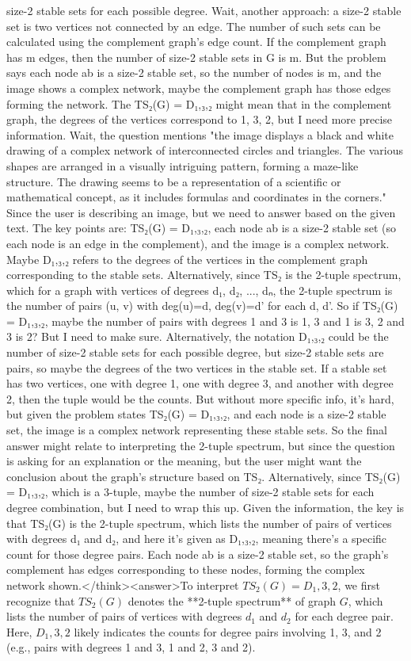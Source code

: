 size-2 stable sets for each possible degree. Wait, another approach: a size-2 stable set is two vertices not connected by an edge. The number of such sets can be calculated using the complement graph's edge count. If the complement graph has m edges, then the number of size-2 stable sets in G is m. But the problem says each node ab is a size-2 stable set, so the number of nodes is m, and the image shows a complex network, maybe the complement graph has those edges forming the network. The TS₂(G) = D₁,₃,₂ might mean that in the complement graph, the degrees of the vertices correspond to 1, 3, 2, but I need more precise information. Wait, the question mentions "the image displays a black and white drawing of a complex network of interconnected circles and triangles. The various shapes are arranged in a visually intriguing pattern, forming a maze-like structure. The drawing seems to be a representation of a scientific or mathematical concept, as it includes formulas and coordinates in the corners." Since the user is describing an image, but we need to answer based on the given text. The key points are: TS₂(G) = D₁,₃,₂, each node ab is a size-2 stable set (so each node is an edge in the complement), and the image is a complex network. Maybe D₁,₃,₂ refers to the degrees of the vertices in the complement graph corresponding to the stable sets. Alternatively, since TS₂ is the 2-tuple spectrum, which for a graph with vertices of degrees d₁, d₂, ..., dₙ, the 2-tuple spectrum is the number of pairs (u, v) with deg(u)=d, deg(v)=d' for each d, d'. So if TS₂(G) = D₁,₃,₂, maybe the number of pairs with degrees 1 and 3 is 1, 3 and 1 is 3, 2 and 3 is 2? But I need to make sure. Alternatively, the notation D₁,₃,₂ could be the number of size-2 stable sets for each possible degree, but size-2 stable sets are pairs, so maybe the degrees of the two vertices in the stable set. If a stable set has two vertices, one with degree 1, one with degree 3, and another with degree 2, then the tuple would be the counts. But without more specific info, it's hard, but given the problem states TS₂(G) = D₁,₃,₂, and each node is a size-2 stable set, the image is a complex network representing these stable sets. So the final answer might relate to interpreting the 2-tuple spectrum, but since the question is asking for an explanation or the meaning, but the user might want the conclusion about the graph's structure based on TS₂. Alternatively, since TS₂(G) = D₁,₃,₂, which is a 3-tuple, maybe the number of size-2 stable sets for each degree combination, but I need to wrap this up. Given the information, the key is that TS₂(G) is the 2-tuple spectrum, which lists the number of pairs of vertices with degrees d₁ and d₂, and here it's given as D₁,₃,₂, meaning there's a specific count for those degree pairs. Each node ab is a size-2 stable set, so the graph's complement has edges corresponding to these nodes, forming the complex network shown.</think><answer>To interpret \( TS_2(G) = D_1,3,2 \), we first recognize that \( TS_2(G) \) denotes the **2-tuple spectrum** of graph \( G \), which lists the number of pairs of vertices with degrees \( d_1 \) and \( d_2 \) for each degree pair. Here, \( D_1,3,2 \) likely indicates the counts for degree pairs involving 1, 3, and 2 (e.g., pairs with degrees 1 and 3, 1 and 2, 3 and 2).  

